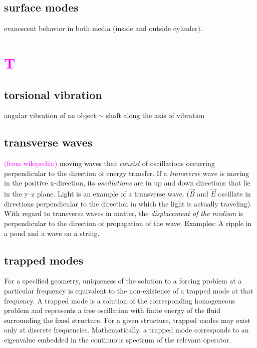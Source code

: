 \documentclass[12pt]{article}
\begin{document}
\subsection*{surface modes}
evanescent behavior in both media (inside and outside cylinder).


\section*{\textcolor{magenta}{T}}

\subsection*{torsional vibration}
\begin{itemize*}
    \item angular vibration of an object $\sim$ shaft along the
        axis of vibration
\end{itemize*}

\subsection*{transverse waves}
\textcolor{magenta}{(from wikipedia:)}
moving waves that \emph{consist} of oscillations occurring perpendicular
to the direction of energy transfer.
If a \emph{transverse} wave is moving in the positive x-direction,
its \emph{oscillations} are in up and down directions that lie in the y–z plane.
Light is an example of a transverse wave.
($\vec B$ and $\vec E$ oscillate in directions perpendicular to the direction
in which the light is actually traveling).
With regard to transverse waves in matter,
the \emph{displacement of the medium} is perpendicular to the
direction of propagation of the wave.
Examples: A ripple in a pond and a wave on a string.

\subsection*{trapped modes}
For a specified geometry, uniqueness of the solution to a forcing problem
at a particular frequency is equivalent to the non-existence of a trapped
mode at that frequency. A trapped mode is a solution of the corresponding
homogeneous problem and represents a free oscillation with finite energy
of the fluid surrounding the fixed structure. For a given structure,
trapped modes may exist only at discrete frequencies.
Mathematically, a trapped mode corresponds to an eigenvalue embedded
in the continuous spectrum of the relevant operator.
\end{document}
